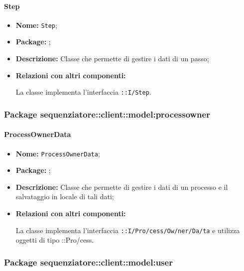\paragraph{Step}
\begin{flushleft}
\begin{itemize}
\item \textbf{Nome:} \texttt{Step};
\item \textbf{Package:} \texttt{\model{}};
\item \textbf{Descrizione:} Classe che permette di gestire i dati di un passo;
\item \textbf{Relazioni con altri componenti:}
\begin{sloppypar}
La classe implementa l'interfaccia \texttt{\model{}::I\fshyp{}Step}.
\end{sloppypar}
\end{itemize}
\end{flushleft}

\subsubsection{Package sequenziatore::client::model:processowner}
\paragraph{ProcessOwnerData}
\begin{flushleft}
\begin{itemize}
\item \textbf{Nome:} \texttt{ProcessOwnerData};
\item \textbf{Package:} \texttt{\modelAdmin{}};
\item \textbf{Descrizione:} Classe che permette di gestire i dati di un processo e il salvataggio in locale di tali dati;
\item \textbf{Relazioni con altri componenti:}
\begin{sloppypar}
La classe implementa l'interfaccia \texttt{\iModelAdmin{}::I\fshyp{}Pro\fshyp{}cess\fshyp{}Ow\fshyp{}ner\fshyp{}Da\fshyp{}ta} e utilizza oggetti di tipo \texttt{\model{}}::Pro\fshyp{}cess.
\end{sloppypar}
\end{itemize}
\end{flushleft}

\subsubsection{Package sequenziatore::client::model:user}
